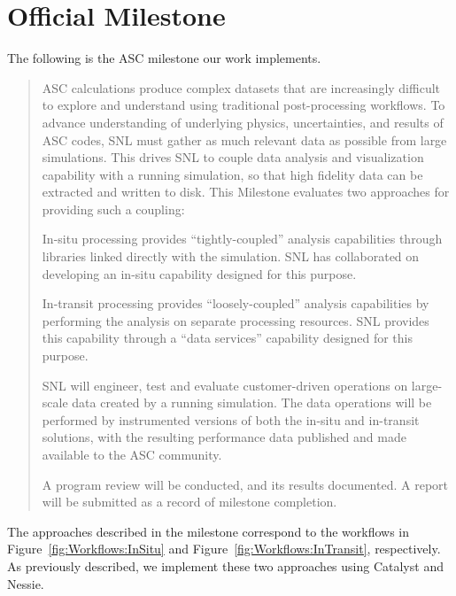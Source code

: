 \section{Official Milestone}
\label{sec:OfficialMilestone}

The following is the ASC milestone our work implements.

\begin{quotation}

ASC calculations produce complex datasets that are increasingly difficult to explore and understand using traditional post-processing workflows.  To advance understanding of underlying physics, uncertainties, and results of ASC codes, SNL must gather as much relevant data as possible from large simulations.  This drives SNL to couple data analysis and visualization capability with a running simulation, so that high fidelity data can be extracted and written to disk.  This Milestone evaluates two approaches for providing such a coupling:

\begin{enumerate}
\begin{item}
In-situ processing provides ``tightly-coupled'' analysis capabilities through libraries linked directly with the simulation.  SNL has collaborated on developing an in-situ capability designed for this purpose.
\end{item}
\begin{item}
In-transit processing provides ``loosely-coupled'' analysis capabilities by performing the analysis on separate processing resources.  SNL provides this capability through a ``data services'' capability designed for this purpose.
\end{item}
\end{enumerate}

SNL will engineer, test and evaluate customer-driven operations on large-scale data created by a running simulation.  The data operations will be performed by instrumented versions of both the in-situ and in-transit solutions, with the resulting performance data published and made available to the ASC community.

A program review will be conducted, and its results documented.  A report will be submitted as a record of milestone completion.

\end{quotation}

The approaches described in the milestone correspond to the workflows in
Figure~\ref{fig:Workflows:InSitu} and Figure~\ref{fig:Workflows:InTransit},
respectively.  As previously described, we implement these two approaches
using Catalyst and Nessie.

